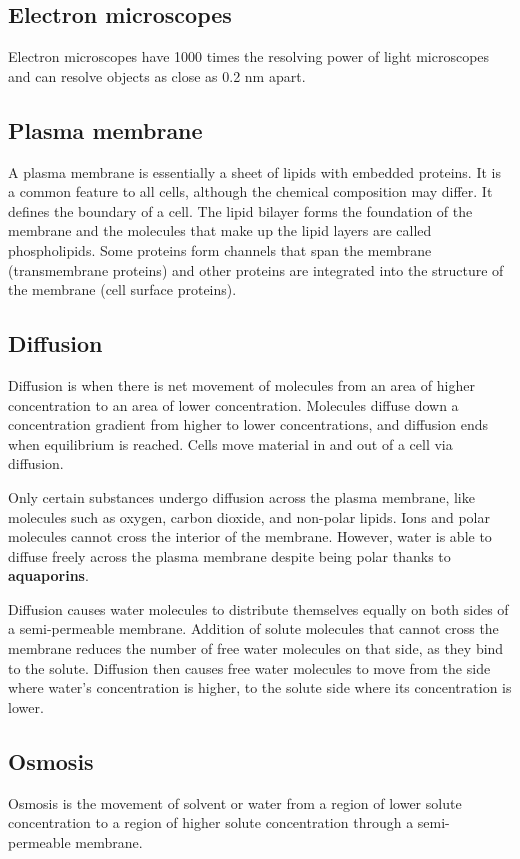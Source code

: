 \documentclass[11pt]{article}
\begin{document}
\subsection{Electron microscopes}
\label{sec:orge3930a7}
Electron microscopes have 1000 times the resolving power of light microscopes and can resolve objects as close as 0.2 \(\unit{\nano\metre}\) apart.

\newpage
\subsection{Plasma membrane}
\label{sec:org9c5f767}
A plasma membrane is essentially a sheet of lipids with embedded proteins. It is a common feature to all cells, although the chemical composition may differ. It defines the boundary of a cell. The lipid bilayer forms the foundation of the membrane and the molecules that make up the lipid layers are called phospholipids. Some proteins form channels that span the membrane (transmembrane proteins) and other proteins are integrated into the structure of the membrane (cell surface proteins).
\subsection{Diffusion}
\label{sec:orgd1c5015}
Diffusion is when there is net movement of molecules from an area of higher concentration to an area of lower concentration. Molecules diffuse down a concentration gradient from higher to lower concentrations, and diffusion ends when equilibrium is reached. Cells move material in and out of a cell via diffusion.


Only certain substances undergo diffusion across the plasma membrane, like molecules such as oxygen, carbon dioxide, and non-polar lipids. Ions and polar molecules cannot cross the interior of the membrane. However, water is able to diffuse freely across the plasma membrane despite being polar thanks to \textbf{aquaporins}.


Diffusion causes water molecules to distribute themselves equally on both sides of a semi-permeable membrane. Addition of solute molecules that cannot cross the membrane reduces the number of free water molecules on that side, as they bind to the solute. Diffusion then causes free water molecules to move from the side where water's concentration is higher, to the solute side where its concentration is lower.
\subsection{Osmosis}
\label{sec:org699bb2e}
Osmosis is the movement of solvent or water from a region of lower solute concentration to a region of higher solute concentration through a semi-permeable membrane.
\end{document}
